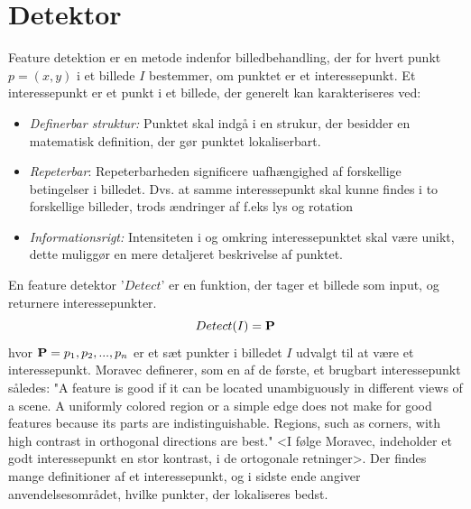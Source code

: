 \section{Detektor}\label{sec:detect}
Feature detektion er en metode indenfor billedbehandling, der for hvert punkt $p = (x,y)$ i et billede $I$ bestemmer, om punktet er et interessepunkt. Et interessepunkt er et punkt i et billede, der generelt kan karakteriseres ved\cite{pointsurvey}:
\begin{itemize}
\item{\textit{Definerbar struktur:} Punktet skal indgå i en strukur, der besidder en matematisk definition, der gør punktet lokaliserbart.}
\item{\emph{Repeterbar}: Repeterbarheden significere uafhængighed af forskellige betingelser i billedet. Dvs. at samme interessepunkt skal kunne findes i to forskellige billeder, trods ændringer af f.eks lys og rotation}
\item{\emph{Informationsrigt:}
Intensiteten i og omkring interessepunktet skal være unikt, dette muliggør en mere detaljeret beskrivelse af punktet.}
\end{itemize}
En feature detektor '$Detect$' er en funktion, der tager et billede som input, og returnere interessepunkter.
\begin{equation}
Detect(I)= \bold{P}
\label{detect}
\end{equation}
hvor $\bold{P} = {p_1, p_2,..., p_n}$ er et sæt punkter i billedet $I$ udvalgt til at være et interessepunkt.
Moravec \cite{moravec} definerer, som en af de første, et brugbart interessepunkt således: "A
feature is good if it can be located unambiguously in different views of a scene. A
uniformly colored region or a simple edge does not make for good features because
its parts are indistinguishable. Regions, such as corners, with high contrast in
orthogonal directions are best." <I følge Moravec, indeholder et godt interessepunkt en stor kontrast, i de ortogonale retninger>. Der findes mange definitioner af et interessepunkt, og i sidste ende angiver anvendelsesområdet, hvilke punkter, der lokaliseres bedst.
